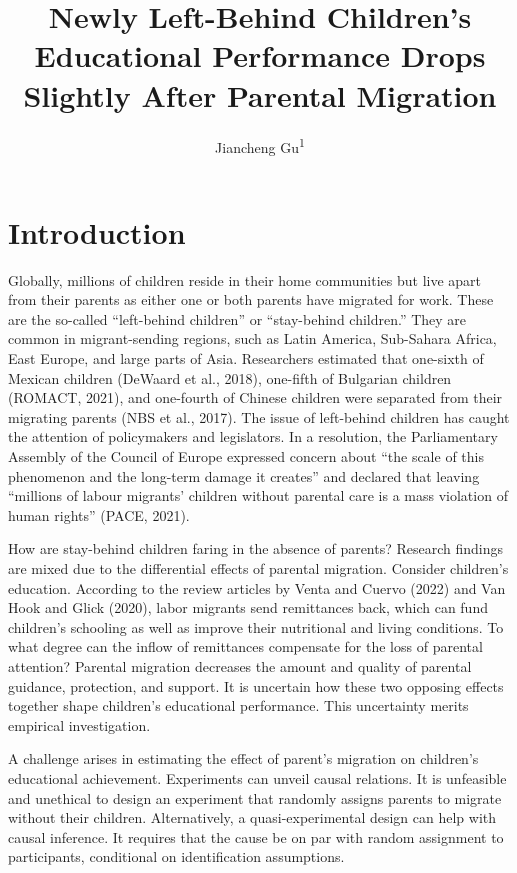 \documentclass[
  man,floatsintext]{apa7}
\title{Newly Left-Behind Children's Educational Performance Drops Slightly After Parental Migration}
\author{Jiancheng Gu\textsuperscript{1}}
\date{}
\affiliation{\vspace{0.5cm}\textsuperscript{1} Faculty of Social Sciences, Vrije Universiteit Amsterdam}
\begin{document}
\maketitle

\hypertarget{introduction}{%
\section{Introduction}\label{introduction}}

Globally, millions of children reside in their home communities but live apart from their parents as either one or both parents have migrated for work. These are the so-called ``left-behind children'' or ``stay-behind children.'' They are common in migrant-sending regions, such as Latin America, Sub-Sahara Africa, East Europe, and large parts of Asia. Researchers estimated that one-sixth of Mexican children (DeWaard et al., 2018), one-fifth of Bulgarian children (ROMACT, 2021), and one-fourth of Chinese children were separated from their migrating parents (NBS et al., 2017). The issue of left-behind children has caught the attention of policymakers and legislators. In a resolution, the Parliamentary Assembly of the Council of Europe expressed concern about ``the scale of this phenomenon and the long-term damage it creates'' and declared that leaving ``millions of labour migrants' children without parental care is a mass violation of human rights'' (PACE, 2021).

How are stay-behind children faring in the absence of parents? Research findings are mixed due to the differential effects of parental migration. Consider children's education. According to the review articles by Venta and Cuervo (2022) and Van Hook and Glick (2020), labor migrants send remittances back, which can fund children's schooling as well as improve their nutritional and living conditions. To what degree can the inflow of remittances compensate for the loss of parental attention? Parental migration decreases the amount and quality of parental guidance, protection, and support. It is uncertain how these two opposing effects together shape children's educational performance. This uncertainty merits empirical investigation.

A challenge arises in estimating the effect of parent's migration on children's educational achievement. Experiments can unveil causal relations. It is unfeasible and unethical to design an experiment that randomly assigns parents to migrate without their children. Alternatively, a quasi-experimental design can help with causal inference. It requires that the cause be on par with random assignment to participants, conditional on identification assumptions.
\end{document}

